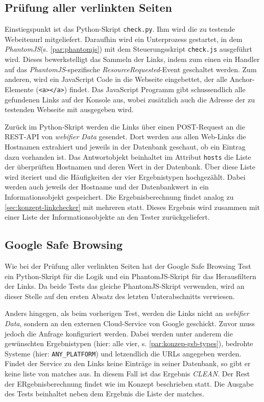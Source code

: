 \subsection{Prüfung aller verlinkten Seiten}

Einstiegspunkt ist das Python-Skript \lstinline{check.py}.
Ihm wird die zu testende Webeitenurl mitgeliefert.
Daraufhin wird ein Unterprozess gestartet, in dem \textit{PhantomJS}(s. \autoref{par:phantomjs}) mit dem Steuerungsskript \lstinline{check.js} ausgeführt wird.
Dieses bewerkstelligt das Sammeln der Links, indem zum einen ein Handler auf das \textit{PhantomJS}-spezifische \textit{ResourceRequested}-Event geschaltet werden.
Zum anderen, wird ein JavaScript Code in die Webseite eingebettet, der alle Anchor-Elemente (\lstinline{<a></a>}) findet.
Das JavaScript Programm gibt schussendlich alle gefundenen Links auf der Konsole aus, wobei zusätzlich auch die Adresse der zu testenden Webseite mit ausgegeben wird.

Zurück im Python-Skript werden die Links über einen POST-Request an die \ac{REST}-\ac{API} von \textit{webifier Data} gesendet.
Dort werden aus allen Web-Links die Hostnamen extrahiert und jeweils in der Datenbank geschaut, ob ein Eintrag dazu vorhanden ist.
Das Antwortobjekt beinhaltet im Attribut \lstinline[style=eclipse]{hosts} die Liste der überprüften Hostnamen und deren Wert in der Datenbank.
Über diese Liste wird iteriert und die Häufigkeiten der vier Ergebnistypen hochgezählt.
Dabei werden auch jeweils der Hostname und der Datenbankwert in ein Informationsobjekt gespeichert.
Die Ergebnisberechnung findet analog zu \autoref{sec:konzept-linkchecker} mit mehreren statt.
Dieses Ergebnis wird zusammen mit einer Liste der Informationsobjekte an den Tester zurückgeliefert.

\subsection{Google Safe Browsing}

Wie bei der Prüfung aller verlinkten Seiten hat der Google Safe Browsing Test ein Python-Skript für die Logik und ein PhantomJS-Skript für das Herausfiltern der Links.
Da beide Tests das gleiche PhantomJS-Skript verwenden, wird an dieser Stelle auf den ersten Absatz des letzten Unterabschnitts verwiesen.

Anders hingegen, als beim vorherigen Test, werden die Links nicht an \textit{webifier Data}, sondern an den externen Cloud-Service von Google geschickt.
Zuvor muss jedoch die Anfrage konfiguriert werden.
Dabei werden unter anderem die gewünschten Ergebnistypen (hier: alle vier, s. \autoref{par:konzep-gsb-types}), bedrohte Systeme (hier: \lstinline{ANY_PLATFORM}) und letzendlich die \acp{URL} angegeben werden.
Findet der Service zu den Links keine Einträge in seiner Datenbank, so gibt er keine liste von matches aus.
In diesem Fall ist das Ergebnis \textit{CLEAN}.
Der Rest der ERgebnisberechnung findet wie im Konzept beschrieben statt.
Die Ausgabe des Tests beinhaltet neben dem Ergebnis die Liste der matches.

